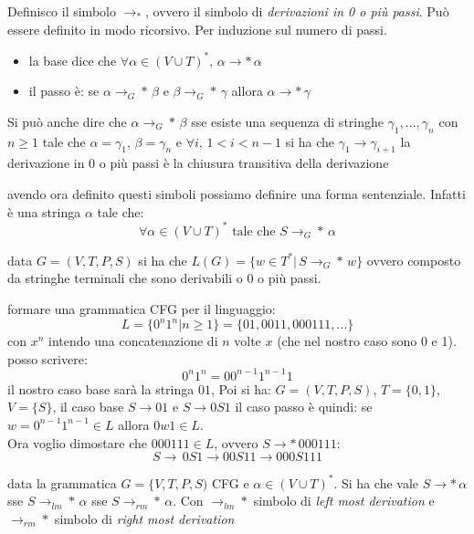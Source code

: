 \documentclass[a4paper,12pt, oneside]{book}
\begin{document}
\begin{definizione}
Definisco il simbolo $\to _*$, ovvero il simbolo di \textit{derivazioni in 0 o più passi}. Può essere definito in modo ricorsivo. Per induzione sul numero di passi.
\begin{itemize}
\item la base dice che  $\forall \alpha\in (V\cup T)^*,\, \alpha\to * \,\alpha$
\item il passo è: se $\alpha\to_G * \,\beta $ e $ \beta \to_G * \,\gamma$ allora $\alpha\to * \,\gamma$
\end{itemize}
Si può anche dire che $\alpha\to_G *\, \beta$ sse esiste una sequenza di stringhe $\gamma_1,...,\gamma_n$ con $n\geq 1$ tale che $\alpha=\gamma_1$, $\beta=\gamma_n$ e $\forall i,\, 1<i<n-1$ si ha che $\gamma_1\to \gamma_{i+1}$
la derivazione in 0 o più passi è la chiusura transitiva della derivazione
\end{definizione}
\begin{definizione}
avendo ora definito questi simboli possiamo definire una forma sentenziale. Infatti è una stringa $\alpha$ tale che:
$$\forall \alpha\in (V\cup T)^* \mbox{ tale che }S\to_G *\, \alpha$$
\end{definizione}
\begin{definizione}
data $G=(V,T,P,S)$ si ha che $L(G)=\{w\in T^* |\, S\to_G *\, w\}$ ovvero composto da stringhe terminali che sono derivabili o 0 o più passi.
\end{definizione}
\begin{esempio}
formare una grammatica CFG per il linguaggio:
$$L=\{0^n 1^n| n\geq 1\}=\{01, 0011, 000111,...\}$$
con $x^n$ intendo una concatenazione di $n$ volte $x$ (che nel nostro caso sono 0 e 1).\\
posso scrivere:
$$0^n 1^n =00^{n-1} 1^{n-1}1$$
il nostro caso base sarà la stringa $01$, Poi si ha:
$G=(V,T,P,S)$, $T=\{0,1\}$, $V=\{S\}$, il caso base $S\to 01$  e $S\to 0S1$
il caso passo è quindi: se $w= 0^{n-1}1^{n-1}\in L$ allora $0w1\in L$.\\
Ora voglio dimostare che $000111\in L$, ovvero $S\to*\, 000111$:\\
$$S\to\, 0S1 \to 00S11\to 000S111$$
\end{esempio}
\begin{teorema}
data la grammatica $G=\{V,T,P,S)$ CFG e $\alpha\in (V\cup T)^*$. Si ha che vale $S\to*\, \alpha$ sse $S\to_{lm}*\, \alpha$ sse $S\to_{rm}*\, \alpha$. Con $\to_{lm}*$ simbolo di \textit{left most derivation }e $\to_{rm}*$ simbolo di \textit{right most derivation}
\end{teorema}
\end{document}
